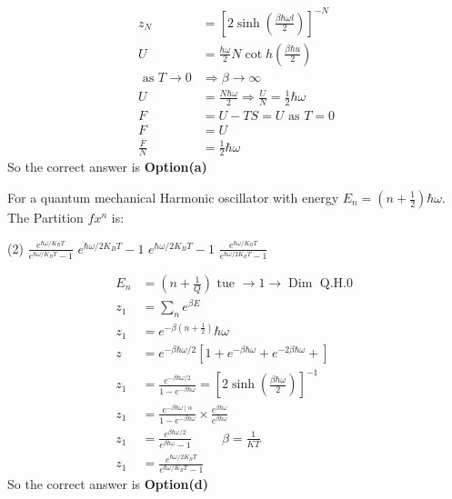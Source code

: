 \begin{answer}
	\begin{align*}
	z_{N}&=\left[2 \sinh \left(\frac{\beta \hbar \omega l}{2}\right)\right]^{-N}\\
	U&=\frac{\hbar \omega}{2} N \cot h\left(\frac{\beta \hbar u}{2}\right)\\
	\text { as } T \rightarrow 0 &\Rightarrow \beta \rightarrow \infty\\
	U&=\frac{N \hbar \omega}{2} \Rightarrow \frac{U}{N}=\frac{1}{2} \hbar \omega\\
	F&=U-T S=U \text { as } T=0\\
	F&=U\\
	\frac{F}{N}&=\frac{1}{2} \hbar \omega
	\end{align*}
	So the correct answer is \textbf{Option(a)}
\end{answer}
\begin{exercise}
	For a quantum mechanical Harmonic oscillator with energy $E_{n}=\left(n+\frac{1}{2}\right) \hbar \omega$. The Partition $f x^{n}$ is:
\end{exercise}
 \begin{tasks}(2)
	\task[\textbf{a.}]$\frac{e^{\hbar\omega/K_BT}}{e^{\hbar\omega/K_BT}-1}$
	\task[\textbf{b.}]$e^{\hbar \omega / 2 K_{B} T}-1$
	\task[\textbf{c.}]$e^{\hbar  \omega / 2 K_{B} T}-1$
	\task[\textbf{d.}] $\frac{e^{\hbar\omega/K_BT}}{e^{\hbar\omega/2K_BT}-1}$
\end{tasks}
\begin{answer}
	\begin{align*}
	E_{n}&=\left(n+\frac{1}{Q}\right) \text { tue } \rightarrow 1 \rightarrow \operatorname{Dim} \text { Q.H.0 }\\
	z_{1}&=\sum_{n} e^{\beta E}\\
	z_1&=e^{-\beta\left(n+\frac{1}{2} \right) }\hbar \omega\\
	z&=e^{-\beta \hbar \omega / 2}\left[1+e^{-\beta \hbar \omega}+e^{-2 \beta \hbar \omega}+\right]\\
	z_{1}&=\frac{e^{-\beta \hbar \omega / 2}}{1-e^{-\beta \hbar \omega}}=\left[2 \sinh \left(\frac{\beta \hbar \omega}{2}\right)\right]^{-1}\\
	z_{1}&=\frac{e^{-\beta \hbar \omega \mid \alpha}}{1-e^{-\beta \hbar \omega}} \times \frac{e^{\beta \hbar \omega}}{e^{\beta \hbar \omega}}\\
	z_{1}&=\frac{e^{\beta \hbar \omega / 2}}{e^{\beta \hbar \omega}-1}\hspace{1cm} \beta=\frac{1}{K T}\\
	z_{1}&=\frac{e^{\hbar \omega / 2 K_{B} T}}{e^{\hbar \omega / K_{B} T}-1}
	\end{align*}
	So the correct answer is \textbf{Option(d)}
\end{answer}
